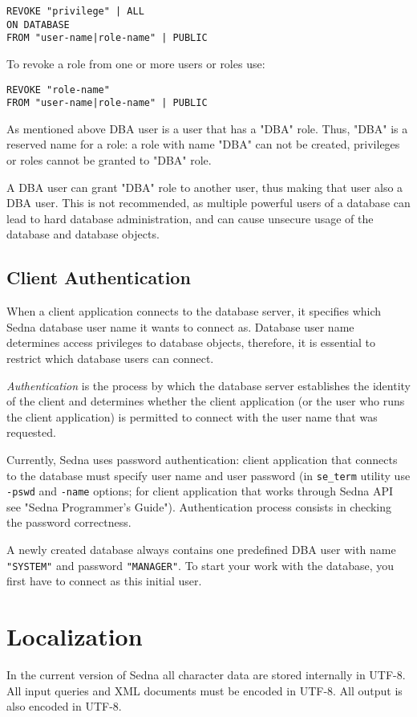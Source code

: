 \documentclass[a4paper,12pt]{article}
\begin{document}
\begin{verbatim}
REVOKE "privilege" | ALL
ON DATABASE 
FROM "user-name|role-name" | PUBLIC
\end{verbatim}

To revoke a role from one or more users or roles use:


\begin{verbatim}
REVOKE "role-name" 
FROM "user-name|role-name" | PUBLIC
\end{verbatim}

As mentioned above DBA user is a user that has a "DBA" role. Thus, "DBA" is a reserved name for a role: a role with name "DBA" can not be created, privileges or roles cannot be granted to "DBA" role.

A DBA user can grant "DBA" role to another user, thus making that user also a DBA user. This is not recommended, as multiple powerful users of a database can lead to hard database administration, and can cause unsecure usage of the database and database objects.


\subsection{Client Authentication}

When a client application connects to the database server, it specifies which Sedna database user name it wants to connect as. Database user name determines access privileges to database objects, therefore, it is essential to restrict which database users can connect.

\emph{Authentication} is the process by which the database server establishes the identity of the client and determines whether the client application (or the user who runs the client application) is permitted to connect with the user name that was requested.

Currently, Sedna uses password authentication: client application that connects to the database must specify user name and user password (in \verb!se_term! utility use \verb!-pswd! and \verb!-name! options; for client application that works through Sedna API see "Sedna Programmer's Guide"). Authentication process consists in checking the password correctness.

A newly created database always contains one predefined DBA user with name \verb!"SYSTEM"! and password \verb!"MANAGER"!. To start your work with the database, you first have to connect as this initial user.

\section{Localization}
In the current version of Sedna all character data are stored internally in UTF-8.
All input queries and XML documents must be encoded in UTF-8.
All output is also encoded in UTF-8.
\end{document}
